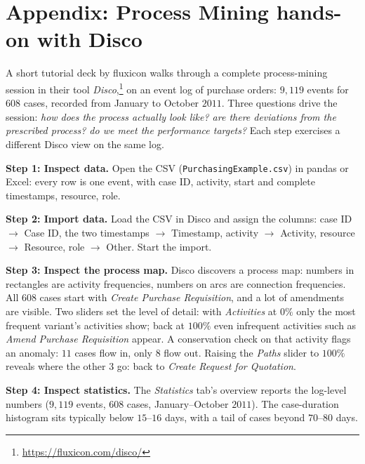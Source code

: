
\section*{Appendix: Process Mining hands-on with Disco}

A short tutorial deck by fluxicon walks through a complete process-mining session in their tool \emph{Disco},\footnote{\url{https://fluxicon.com/disco/}} on an event log of purchase orders: $9{,}119$ events for $608$ cases, recorded from January to October $2011$. Three questions drive the session: \emph{how does the process actually look like? are there deviations from the prescribed process? do we meet the performance targets?} Each step exercises a different Disco view on the same log.

\textbf{Step 1: Inspect data.} Open the CSV (\texttt{PurchasingExample.csv}) in pandas or Excel: every row is one event, with case ID, activity, start and complete timestamps, resource, role.

\textbf{Step 2: Import data.} Load the CSV in Disco and assign the columns: case ID $\to$ Case ID, the two timestamps $\to$ Timestamp, activity $\to$ Activity, resource $\to$ Resource, role $\to$ Other. Start the import.

\textbf{Step 3: Inspect the process map.} Disco discovers a process map: numbers in rectangles are activity frequencies, numbers on arcs are connection frequencies. All $608$ cases start with \emph{Create Purchase Requisition}, and a lot of amendments are visible. Two sliders set the level of detail: with \emph{Activities} at $0\%$ only the most frequent variant's activities show; back at $100\%$ even infrequent activities such as \emph{Amend Purchase Requisition} appear. A conservation check on that activity flags an anomaly: $11$ cases flow in, only $8$ flow out. Raising the \emph{Paths} slider to $100\%$ reveals where the other $3$ go: back to \emph{Create Request for Quotation}.

\textbf{Step 4: Inspect statistics.} The \emph{Statistics} tab's overview reports the log-level numbers ($9{,}119$ events, $608$ cases, January--October $2011$). The case-duration histogram sits typically below $15$--$16$ days, with a tail of cases beyond $70$--$80$ days.


